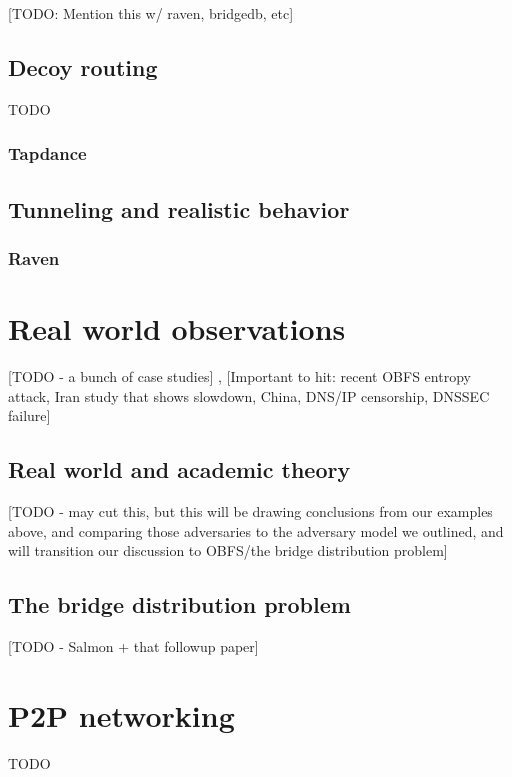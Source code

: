 \documentclass[12pt]{report}
\begin{document}
[TODO: Mention this w/ raven, bridgedb, etc]

\subsection{Decoy routing}

TODO

\subsubsection{Tapdance}

\subsection{Tunneling and realistic behavior}

\subsubsection{Raven}

\section{Real world observations}
\label{real}

[TODO - a bunch of case studies]
 ,
[Important to hit: recent OBFS entropy attack, Iran study that shows slowdown, China, DNS/IP censorship, DNSSEC failure]

\subsection{Real world and academic theory}

[TODO - may cut this, but this will be drawing conclusions from our examples above, and comparing those adversaries to the adversary model we outlined, and will transition our discussion to OBFS/the bridge distribution problem]

\subsection{The bridge distribution problem}

[TODO - Salmon + that followup paper]

\section{P2P networking}

TODO
\end{document}

